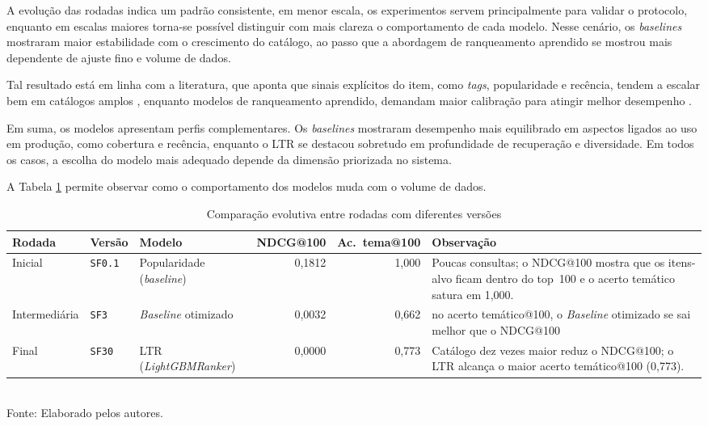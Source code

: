 \documentclass[a4paper,12pt]{article}
\begin{document}
{A evolução das rodadas indica um padrão consistente, em menor escala, os experimentos servem principalmente para validar o protocolo, enquanto em escalas maiores torna-se possível distinguir com mais clareza o comportamento de cada modelo. Nesse cenário, os \textit{baselines} mostraram maior estabilidade com o crescimento do catálogo, ao passo que a abordagem de ranqueamento aprendido se mostrou mais dependente de ajuste fino e volume de dados. 

Tal resultado está em linha com a literatura, que aponta que sinais explícitos do item, como \textit{tags}, popularidade e recência, tendem a escalar bem em catálogos amplos \cite{Lops2011CB}, enquanto modelos de ranqueamento aprendido, demandam maior calibração para atingir melhor desempenho \cite{Ke2017LightGBM,Burges2010LTROverview}.

Em suma, os modelos apresentam perfis complementares. Os \textit{baselines} mostraram desempenho mais equilibrado em aspectos ligados ao uso em produção, como cobertura e recência, enquanto o LTR se destacou sobretudo em profundidade de recuperação e diversidade. Em todos os casos, a escolha do modelo mais adequado depende da dimensão priorizada no sistema.

A Tabela \ref{tab:comparacao_snapshots_tcc} permite observar como o comportamento dos modelos muda com o volume de dados.

\begin{table}[H]
\centering
\caption{Comparação evolutiva entre rodadas com diferentes versões}
\label{tab:comparacao_snapshots_tcc}
\small
\begin{tabular}{|l|l|p{2.8cm}|r|r|p{3.6cm}|}
\hline
\textbf{Rodada} & \textbf{Versão} & \textbf{Modelo} & \textbf{NDCG@100} & \textbf{Ac.\ tema@100} & \textbf{Observação} \\
\hline
Inicial & \texttt{SF0.1} & Popularidade (\textit{baseline}) & 0,1812 & 1,000 & Poucas consultas; o NDCG@100 mostra que os itens-alvo ficam dentro do top~100 e o acerto temático satura em 1,000. \\
\hline
Intermediária & \texttt{SF3} & \textit{Baseline} otimizado & 0,0032 & 0,662 & no acerto temático@100, o \textit{Baseline} otimizado se sai melhor que o NDCG@100  \\
\hline
Final & \texttt{SF30} & LTR (\textit{LightGBMRanker}) & 0,0000 & 0,773 & Catálogo dez vezes maior reduz o NDCG@100; o LTR alcança o maior acerto temático@100 (0,773). \\
\hline
\end{tabular}
\small \\ Fonte: Elaborado pelos autores.
\end{table}

}
\end{document}
